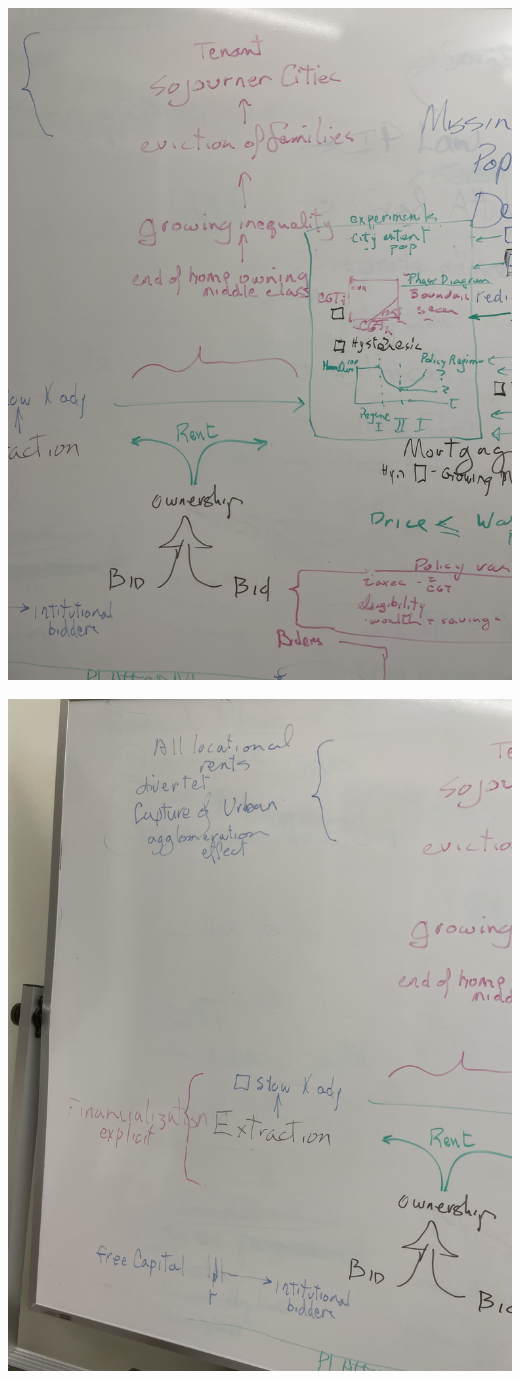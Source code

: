 \documentclass[12pt]{article}
\begin{document}
\includegraphics[scale=.5, angle=-90]{IMG_2691.jpg}

\includegraphics[scale=.5, angle=-90]{IMG_2692.jpg}
\end{document}
